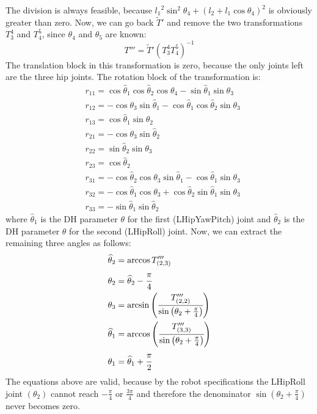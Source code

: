 The division is always feasible, because ${l_1}^2\sin^2\theta_4 + \left(l_2 + l_1\cos\theta_4\right)^2$ is obviously greater than zero. 
Now, we can go back $\widetilde{T}'$ and remove the two transformations $T^4_3$ and $T^5_4$, since $\theta_4$ and $\theta_5$ are known: 
\[
T''' = \widetilde{T}' \left(T^4_3T^5_4\right)^{-1}
\]
The translation block in this transformation is zero, because the only joints left are the three hip joints. The rotation block of the transformation is:
\begin{align*}
&r_{11} = \cos\widehat{\theta}_1\cos\widehat{\theta}_2\cos\theta_4 - \sin\widehat{\theta}_1\sin\theta_3\\
&r_{12} = -\cos\theta_3\sin\widehat{\theta}_1 - \cos\widehat{\theta}_1\cos\widehat{\theta}_2\sin\theta_3\\
&r_{13} = \cos\widehat{\theta}_1\sin\widehat{\theta}_2 \\
&r_{21} = -\cos\theta_3\sin\widehat{\theta}_2\\
&r_{22} = \sin\widehat{\theta}_2\sin\theta_3\\
&r_{23} = \cos\widehat{\theta}_2\\
&r_{31} = -\cos\widehat{\theta}_2\cos\theta_3\sin\widehat{\theta}_1 - \cos\widehat{\theta}_1\sin\theta_3\\
&r_{32} = -\cos\widehat{\theta}_1\cos\theta_3 + \cos\widehat{\theta}_2\sin\widehat{\theta}_1\sin\theta_3\\
&r_{33} = -\sin\widehat{\theta}_1\sin\widehat{\theta}_2
\end{align*}
where $\widehat{\theta}_1$ is the DH parameter $\theta$ for the first (LHipYawPitch) joint and $\widehat{\theta}_2$ is the DH parameter $\theta$ for the second (LHipRoll) joint.
Now, we can extract the remaining three angles as follows:
\begin{align*}
\widehat{\theta}_2 &= \arccos T'''_{(2,3)}\\
\theta_2 &= \widehat{\theta}_2 - \cfrac{\pi}{4}\\
\theta_3 &= \arcsin\left(\cfrac{T'''_{(2,2)}}{\sin\left(\theta_2+\frac{\pi}{4}\right)}\right)\\
\widehat{\theta}_1 &= \arccos\left(\cfrac{T'''_{(3,3)}}{\sin\left(\theta_2+\frac{\pi}{4}\right)}\right)\\
\theta_1 &= \widehat{\theta}_1 + \cfrac{\pi}{2}
\end{align*}
The equations above are valid, because by the robot specifications the LHipRoll joint $(\theta_2)$ cannot reach $-\frac{\pi}{4}$ or $\frac{3\pi}{4}$ and therefore the denominator $\sin\left(\theta_2+\frac{\pi}{4}\right)$ never becomes zero. 

